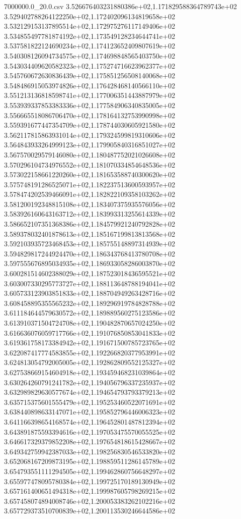 \begin{filecontents*}{7000000.0_20.0.csv}
3.526676403231880386e+02,1.171829588364789743e+02
3.529402788264122250e+02,1.172402096134819658e+02
3.532129153137895514e+02,1.172975276117149406e+02
3.534855497781874192e+02,1.173549128234644741e+02
3.537581822124690234e+02,1.174123652409807619e+02
3.540308126094734575e+02,1.174698848565403750e+02
3.543034409620582323e+02,1.175274716623962377e+02
3.545760672630836439e+02,1.175851256508140068e+02
3.548486915053974826e+02,1.176428468140566110e+02
3.551213136818598741e+02,1.177006351443887979e+02
3.553939337853383336e+02,1.177584906340835005e+02
3.556665518086706470e+02,1.178164132753990998e+02
3.559391677447354709e+02,1.178744030605921580e+02
3.562117815863931014e+02,1.179324599819310606e+02
3.564843933264999123e+02,1.179905840316851027e+02
3.567570029579146080e+02,1.180487752021026608e+02
3.570296104734976552e+02,1.181070334854648536e+02
3.573022158661220260e+02,1.181653588740300620e+02
3.575748191286525071e+02,1.182237513600593957e+02
3.578474202539466091e+02,1.182822109358103262e+02
3.581200192348815108e+02,1.183407375935576056e+02
3.583926160643163712e+02,1.183993313255614339e+02
3.586652107351368386e+02,1.184579921240792828e+02
3.589378032401878613e+02,1.185167199813813568e+02
3.592103935723468453e+02,1.185755148897314939e+02
3.594829817244924470e+02,1.186343768413780708e+02
3.597555676895034935e+02,1.186933058286003870e+02
3.600281514602388029e+02,1.187523018436595521e+02
3.603007330295773727e+02,1.188113648788194041e+02
3.605733123903851833e+02,1.188704949263428716e+02
3.608458895355565232e+02,1.189296919784828788e+02
3.611184644579630572e+02,1.189889560275123586e+02
3.613910371504724708e+02,1.190482870657024250e+02
3.616636076059717766e+02,1.191076850853041833e+02
3.619361758173384942e+02,1.191671500785723765e+02
3.622087417774583855e+02,1.192266820377953991e+02
3.624813054792005005e+02,1.192862809552125327e+02
3.627538669154604918e+02,1.193459468231039864e+02
3.630264260791241782e+02,1.194056796337235937e+02
3.632989829630577674e+02,1.194654793793379213e+02
3.635715375601555479e+02,1.195253460522071691e+02
3.638440898633147071e+02,1.195852796446006323e+02
3.641166398654168574e+02,1.196452801487812394e+02
3.643891875593394616e+02,1.197053475570055525e+02
3.646617329379852208e+02,1.197654818615428667e+02
3.649342759942387033e+02,1.198256830546533820e+02
3.652068167209873195e+02,1.198859511286145789e+02
3.654793551111294505e+02,1.199462860756648297e+02
3.655977478095780384e+02,1.199725170189130949e+02
3.657161400651494318e+02,1.199987605798269215e+02
3.657458074894008746e+02,1.200053383262102216e+02
3.657729373510700839e+02,1.200113530246644586e+02

\end{filecontents*}
